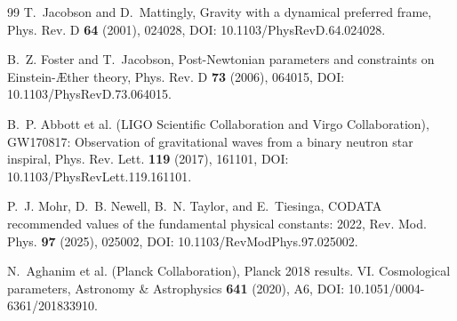 \documentclass[11pt]{article}
\theoremstyle{definition}
\theoremstyle{plain}
\theoremstyle{remark}
\begin{document}
\begin{thebibliography}{99}
            T.~Jacobson and D.~Mattingly,
            \newblock Gravity with a dynamical preferred frame,
            \newblock Phys. Rev. D \textbf{64} (2001), 024028,
            \newblock DOI: 10.1103/PhysRevD.64.024028.

            B.~Z. Foster and T.~Jacobson,
            \newblock Post-Newtonian parameters and constraints on Einstein-\AE ther theory,
            \newblock Phys. Rev. D \textbf{73} (2006), 064015,
            \newblock DOI: 10.1103/PhysRevD.73.064015.

            B.~P. Abbott et al. (LIGO Scientific Collaboration and Virgo Collaboration),
            \newblock GW170817: Observation of gravitational waves from a binary neutron star inspiral,
            \newblock Phys. Rev. Lett. \textbf{119} (2017), 161101,
            \newblock DOI: 10.1103/PhysRevLett.119.161101.

            P.~J. Mohr, D.~B. Newell, B.~N. Taylor, and E.~Tiesinga,
            \newblock CODATA recommended values of the fundamental physical constants: 2022,
            \newblock Rev. Mod. Phys. \textbf{97} (2025), 025002,
            \newblock DOI: 10.1103/RevModPhys.97.025002.

            N.~Aghanim et al. (Planck Collaboration),
            \newblock Planck 2018 results. VI. Cosmological parameters,
            \newblock Astronomy \& Astrophysics \textbf{641} (2020), A6,
            \newblock DOI: 10.1051/0004-6361/201833910.

        \end{thebibliography}
\end{document}
